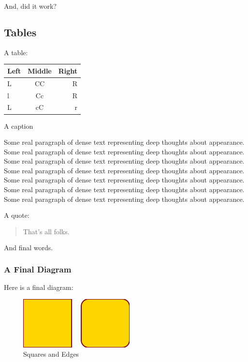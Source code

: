And, did it work?

\hypertarget{tables}{%
\subsection{Tables}\label{tables}}

A table:

\begin{longtable}[]{@{}lcr@{}}
\toprule()
Left & Middle & Right \\
\midrule()
\endhead
L & CC & R \\
l & Cc & R \\
L & cC & r \\
\bottomrule()
\end{longtable}

A caption \label{tab:sweet-and-lovely}

Some real paragraph of dense text representing deep thoughts about
appearance. Some real paragraph of dense text representing deep thoughts
about appearance. Some real paragraph of dense text representing deep
thoughts about appearance. Some real paragraph of dense text
representing deep thoughts about appearance. Some real paragraph of
dense text representing deep thoughts about appearance. Some real
paragraph of dense text representing deep thoughts about appearance.
Some real paragraph of dense text representing deep thoughts about
appearance.

A quote:

\begin{quote}
That's all folks.
\end{quote}

And final words.

\hypertarget{a-final-diagram}{%
\subsubsection{A Final Diagram}\label{a-final-diagram}}

Here is a final diagram:


\begin{figure}
\centering
\includegraphics{diagrams/squares-and-edges.png}
\caption{Squares and Edges}
\end{figure}

